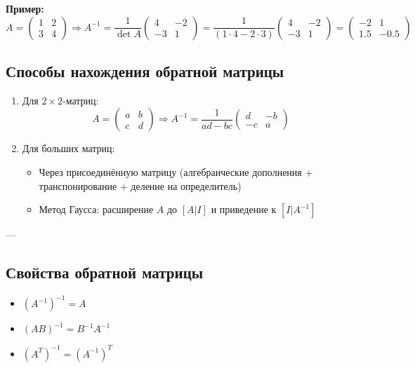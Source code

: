 \textbf{Пример:}
\[
A =
\begin{pmatrix}
1 & 2 \\
3 & 4
\end{pmatrix}
\Rightarrow
A^{-1} = \frac{1}{\det A}
\begin{pmatrix}
4 & -2 \\
-3 & 1
\end{pmatrix}
=
\frac{1}{(1\cdot4 - 2\cdot3)}
\begin{pmatrix}
4 & -2 \\
-3 & 1
\end{pmatrix}
=
\begin{pmatrix}
-2 & 1 \\
1.5 & -0.5
\end{pmatrix}
\]

\subsection*{Способы нахождения обратной матрицы}

\begin{enumerate}
  \item Для $2\times2$-матриц:
  \[
  A = \begin{pmatrix}a & b\\ c & d\end{pmatrix}
  \Rightarrow
  A^{-1} = \frac{1}{ad - bc} \begin{pmatrix}d & -b \\ -c & a\end{pmatrix}
  \]

  \item Для больших матриц:
  \begin{itemize}
    \item Через присоединённую матрицу (алгебраические дополнения + транспонирование + деление на определитель)
    \item Метод Гаусса: расширение $A$ до $[A | I]$ и приведение к $[I | A^{-1}]$
  \end{itemize}
\end{enumerate}

---

\subsection*{Свойства обратной матрицы}

\begin{itemize}
  \item $(A^{-1})^{-1} = A$
  \item $(AB)^{-1} = B^{-1} A^{-1}$
  \item $(A^T)^{-1} = (A^{-1})^T$
\end{itemize}

